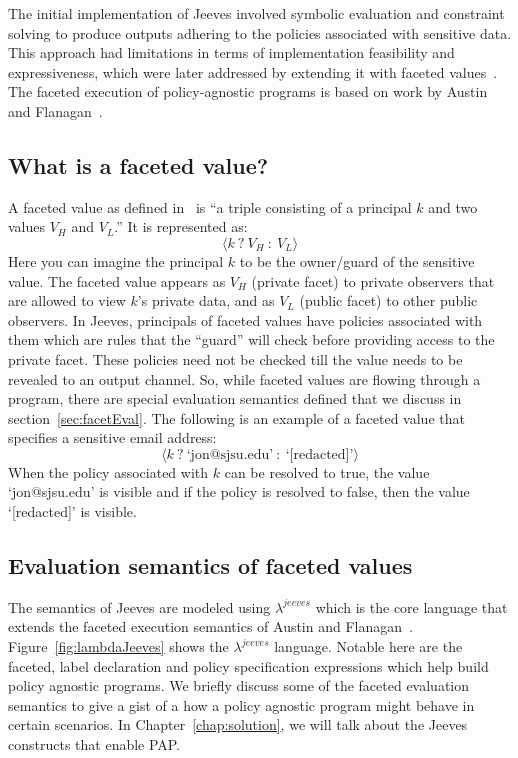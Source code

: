 The initial implementation of Jeeves involved symbolic evaluation and constraint
solving to produce outputs adhering to the policies associated with sensitive data.
This approach had limitations in terms of implementation feasibility and expressiveness,
which were later addressed by extending it with faceted values~\cite{FacetedJeeves}.
The faceted execution of policy-agnostic programs is based on work by Austin and
Flanagan~\cite{Faceted}.

\subsection{What is a faceted value?}
A faceted value as defined in~\cite{Faceted} is ``a triple consisting of a principal
$k$ and two values $V_H$ and $V_L$.'' It is represented as:
\[\langle k~?~V_H~:~V_L \rangle\]
Here you can imagine the principal $k$ to be the owner/guard of the sensitive value.
The faceted value appears as $V_H$ (private facet) to private observers that are
allowed to view $k$'s private data, and as $V_L$ (public facet) to other public
observers. In Jeeves, principals of faceted values have policies associated with
them which are rules that the ``guard'' will check before providing access to the
private facet. These policies need not be checked till the value needs to be revealed
to an output channel. So, while faceted values are flowing through a program, there
are special evaluation semantics defined that we discuss in section~\ref{sec:facetEval}.
The following is an example of a faceted value that specifies a sensitive email
address:
\[\langle k~?~\text{`jon@sjsu.edu'}~:~\text{`[redacted]'} \rangle\]
When the policy associated with $k$ can be resolved to true, the value `jon@sjsu.edu'
is visible and if the policy is resolved to false, then the value `[redacted]' is
visible.

\subsection{Evaluation semantics of faceted values \label{sec:facetEval}}
The semantics of Jeeves are modeled using $\lambda^{jeeves}$ which is the core
language that extends the faceted execution semantics of Austin and Flanagan~\cite{Faceted}.
Figure~\ref{fig:lambdaJeeves} shows the $\lambda^{jeeves}$ language. Notable here
are the faceted, label declaration and policy specification expressions which help
build policy agnostic programs. We briefly discuss some of the faceted evaluation
semantics to give a gist of a how a policy agnostic program might behave in certain
scenarios. In Chapter~\ref{chap:solution}, we will talk about the Jeeves constructs
that enable PAP.


